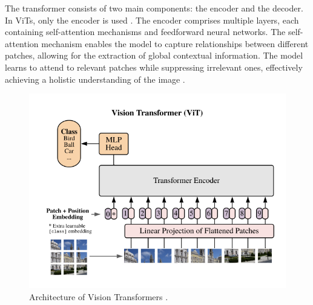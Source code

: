 The transformer consists of two main components: the encoder and the decoder. In ViTs, only the encoder is used \cite{ruan2022vision}. The encoder comprises multiple layers, each containing self-attention mechanisms and feedforward neural networks. The self-attention mechanism enables the model to capture relationships between different patches, allowing for the extraction of global contextual information. The model learns to attend to relevant patches while suppressing irrelevant ones, effectively achieving a holistic understanding of the image \cite{islam2023recent}.

\begin{figure}[h!]
  \centering
  \includegraphics[width=0.8\linewidth]{figures/Vit.png} 
  \caption{Architecture of Vision Transformers \cite{dosovitskiy2021image}.}
  \label{fig:imgMask}
\end{figure}

